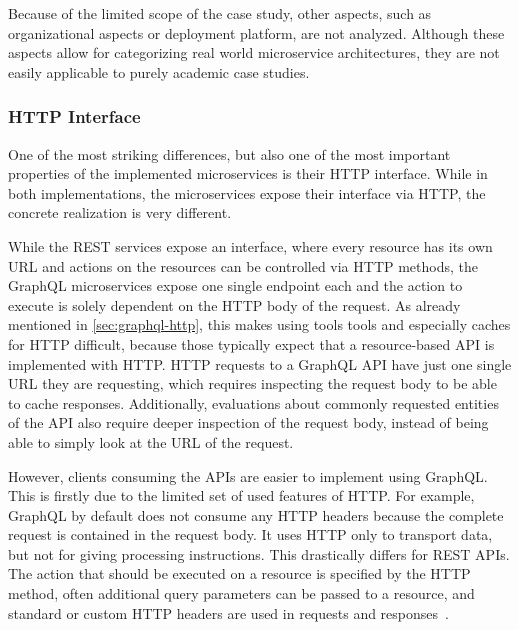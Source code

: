 Because of the limited scope of the case study, other aspects, such as organizational aspects or deployment platform, are not analyzed.
Although these aspects allow for categorizing real world microservice architectures, they are not easily applicable to purely academic case studies.

\subsubsection{\acs{HTTP} Interface}

One of the most striking differences, but also one of the most important properties of the implemented microservices is their \ac{HTTP} interface.
While in both implementations, the microservices expose their interface via \ac{HTTP}, the concrete realization is very different.

While the \ac{REST} services expose an interface, where every resource has its own \ac{URL} and actions on the resources can be controlled via \ac{HTTP} methods, the GraphQL microservices expose one single endpoint each and the action to execute is solely dependent on the \ac{HTTP} body of the request.
As already mentioned in \autoref{sec:graphql-http}, this makes using tools tools and especially caches for \ac{HTTP} difficult, because those typically expect that a resource-based \ac{API} is implemented with \ac{HTTP}.
\ac{HTTP} requests to a GraphQL \ac{API} have just one single \ac{URL} they are requesting, which requires inspecting the request body to be able to cache responses.
Additionally, evaluations about commonly requested entities of the \ac{API} also require deeper inspection of the request body, instead of being able to simply look at the \ac{URL} of the request.

However, clients consuming the \acp{API} are easier to implement using GraphQL.
This is firstly due to the limited set of used features of \ac{HTTP}.
For example, GraphQL by default does not consume any \ac{HTTP} headers because the complete request is contained in the request body.
It uses \ac{HTTP} only to transport data, but not for giving processing instructions.
This drastically differs for \ac{REST} \acp{API}.
The action that should be executed on a resource is specified by the \ac{HTTP} method, often additional query parameters can be passed to a resource, and standard or custom \ac{HTTP} headers are used in requests and responses~\cite{Buelthoff2019}.

